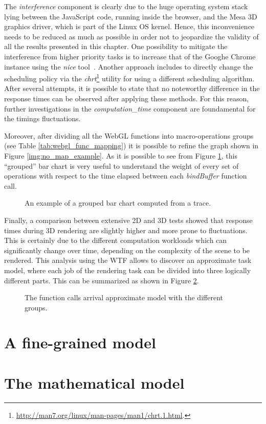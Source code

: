The \emph{interference} component is clearly due to the huge operating system
stack lying between the JavaScript code, running inside the
browser, and the Mesa 3D graphics driver, which is part of the Linux OS kernel.
Hence, this inconvenience needs to be reduced as much as possible in order not to jeopardize the
validity of all the results presented in this chapter. One possibility to mitigate
the interference from higher priority tasks is to increase that of
the Googhe Chrome instance using the \emph{nice} tool~\cite{aas2005understanding}.
Another approach includes to directly change the scheduling policy via the
\emph{chrt}\footnote{\url{http://man7.org/linux/man-pages/man1/chrt.1.html}.}
utility for using a different scheduling algorithm. After several attempts,
it is possible to state that no
noteworthy difference in the response times can be observed after applying these
methods. For this reason, further investigations in the \emph{computation\_time}
component are foundamental for the timings fluctuations.

Moreover, after dividing all the WebGL functions into macro-operations groups
(see Table \ref{tab:webgl_func_mapping}) it is possible to refine the graph shown
in Figure \ref{img:no_map_example}. As it is possible to see from Figure
\ref{img:no_map_groups}, this ``grouped'' bar chart is very useful to understand
the weight of every set of operations with respect to the time elapsed between
each \emph{bindBuffer} function call.
\begin{figure}[!htb]
    \caption{An example of a grouped bar chart computed from a trace.}
    \label{img:no_map_groups}
\end{figure}

Finally, a comparison between extensive 2D and 3D tests showed that response times
during 3D rendering are slightly higher and more prone to fluctuations. This is
certainly due to the different computation workloads which can significantly change
over time, depending on the complexity of the scene to be rendered.
This analysis using the WTF allows to discover an approximate task model, where
each job of the rendering task can be divided into three logically different
parts. This can be summarized as shown in Figure \ref{img:call_arrival}.

\begin{figure}[!htb]
    \caption{The function calls arrival approximate model with the different groups.}
    \label{img:call_arrival}
\end{figure}


\section{A fine-grained model}


\section{The mathematical model}

